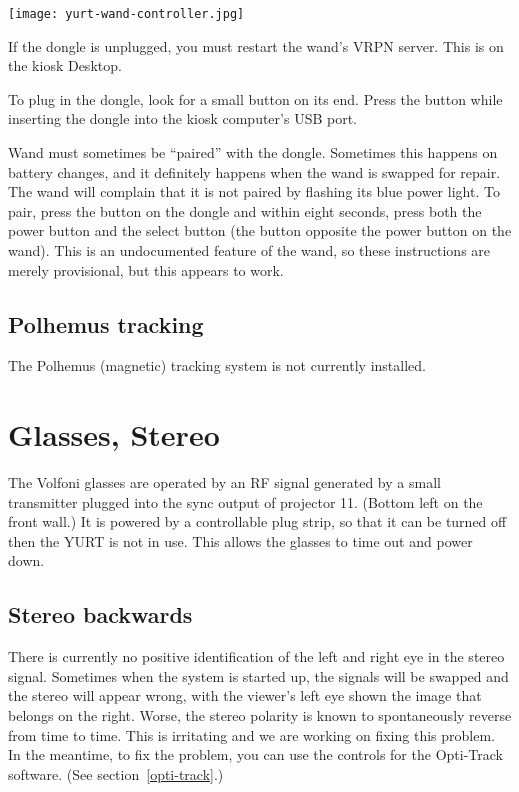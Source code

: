\documentclass[11pt]{article}
\newcommand{\yurt}{YURT\xspace}
\begin{document}
\begin{center}
\texttt{[image: yurt-wand-controller.jpg]}
\end{center}

If the dongle is unplugged, you must restart the wand's VRPN server.
This is on the kiosk Desktop.


To plug in the dongle, look for a small button on its end.  Press the
button while inserting the dongle into the kiosk computer's USB port.

Wand must sometimes be ``paired'' with the dongle.  Sometimes this
happens on battery changes, and it definitely happens when the wand is
swapped for repair.  The wand will complain that it is not paired by
flashing its blue power light.  To pair, press the button on the
dongle and within eight seconds, press both the power button and the
select button (the button opposite the power button on the wand).  This is an
undocumented feature of the wand, so these instructions are merely
provisional, but this appears to work.


\subsection{Polhemus tracking}

The Polhemus (magnetic) tracking system is not currently installed.





\section{Glasses, Stereo}

The Volfoni glasses are operated by an RF signal generated by a small
transmitter plugged into the sync output of projector 11.  (Bottom
left on the front wall.)  It is powered by a controllable plug strip,
so that it can be turned off then the \yurt is not in use.  This allows
the glasses to time out and power down.


\subsection{Stereo backwards}

There is currently no positive identification of the left and right
eye in the stereo signal.  Sometimes when the system is started
up, the signals will be swapped and the stereo will appear wrong, with
the viewer's left eye shown the image that belongs on the right.
Worse, the stereo polarity is known to spontaneously reverse from time to
time.  This is irritating and we are working on fixing this problem.
In the meantime, to fix the problem, you can use the controls for the
Opti-Track software.  (See section~\ref{opti-track}.)
\end{document}
